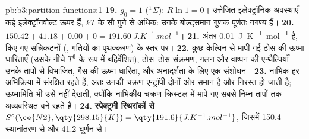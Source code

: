 \begin{solution}{pb:b3:partition-functions:1}
\textbf{19.} $g_0 = 1$ (${}^1\Sigma$): $R\ln1 = 0$। उत्तेजित इलेक्ट्रॉनिक अवस्थाएँ कई
इलेक्ट्रॉनवोल्ट ऊपर हैं, $kT$ के सौ गुने से अधिक: उनके बोल्ट्समान गुणक
पूर्णतः नगण्य हैं।
\textbf{20.} $150.42 + 41.18 + 0.00 + 0 = \qty{191.60}{J.K^{-1}.mol^{-1}}$।
\textbf{21.} अंतर \qty{0.01}{J.K^{-1}.mol^{-1}} है, किए गए
सन्निकटनों (, गतियों का पृथक्करण) के स्तर पर।
\textbf{22.} कुछ केल्विन से मापी गई ठोस की ऊष्मा धारिताएँ (उसके नीचे $T^3$ के रूप में
बहिर्वेशित), ठोस--ठोस संक्रमण, गलन और
वाष्पन की एन्थैल्पियाँ उनके तापों से विभाजित, गैस की ऊष्मा धारिता,
और अनादर्शता के लिए एक संशोधन।
\textbf{23.} नाभिक हर अभिक्रिया में संरक्षित रहते हैं, अतः उनकी चक्रण एन्ट्रॉपी
दोनों ओर समान है और निरस्त हो जाती है; ऊष्मामिति भी उसे नहीं देखती, क्योंकि
नाभिकीय चक्रण क्रिस्टल में मापे गए सबसे निम्न तापों तक अव्यवस्थित
बने रहते हैं।
\textbf{24.} \textbf{स्पेक्ट्रमी स्थिरांकों से $S^\circ(\ce{N2}, \qty{298.15}{K}) = \qty{191.6}{J.K^{-1}.mol^{-1}}$},
जिसमें 150.4 स्थानांतरण से और 41.2 घूर्णन से।
\end{solution}

